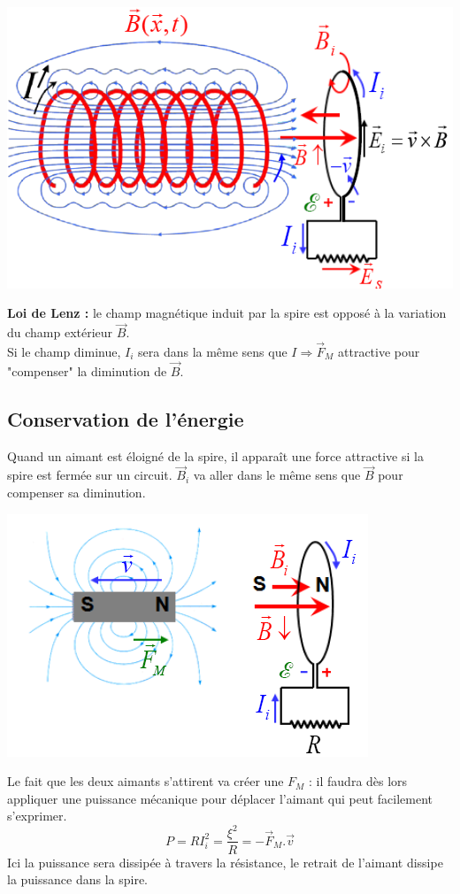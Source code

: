 \documentclass	[11pt, a4paper, openany]{book}
\begin{document}
\begin{center}
\includegraphics[scale=0.55]{em/image17.png}\\
\end{center}
\textbf{Loi de Lenz :} le champ magnétique induit par la spire est opposé à la variation du champ extérieur $\vec{B}$.\\
Si le champ diminue, $I_i$ sera dans la même sens que $I \Rightarrow \vec{F}_M$ attractive pour "compenser" la diminution de $\vec{B}$.

\subsection{Conservation de l'énergie}
Quand un aimant est éloigné de la spire, il apparaît une force attractive si la spire est fermée sur un circuit. $\vec{B}_i$ va aller dans le même sens que $\vec{B}$ pour compenser sa diminution.
\begin{center}
\includegraphics[scale=0.45]{em/image18.png}\\
\end{center}
Le fait que les deux aimants s'attirent va créer une $F_M$ : il faudra dès lors appliquer une puissance mécanique pour déplacer l'aimant qui peut facilement s'exprimer.
\begin{equation}
P = RI_i^2 = \frac{\xi^2}{R} = -\vec{F}_M.\vec{v}
\end{equation}
Ici la puissance sera dissipée à travers la résistance, le retrait de l'aimant dissipe la puissance dans la spire.
\end{document}
